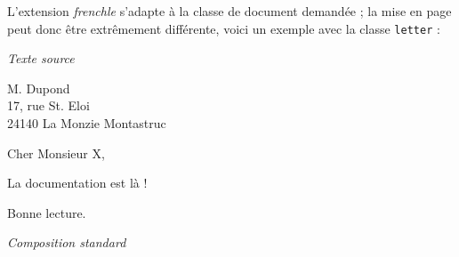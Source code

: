 \documentclass[a4paper,12pt,openright]{article}
\begin{document}
L’extension \textit{frenchle} s’adapte à la classe de document demandée ; la mise
en page peut donc être extrêmement différente, voici un exemple avec la classe
\texttt{letter} :
\begin{center} %
\textit{Texte source}\\[1ex]
\begin{boxedverbatim}
\address{B. \textsc{Gaulle}\\ Mon adresse}
\begin{letter}
       {M. Dupond\\
       17, rue St. \’Eloi\\
       24140 La Monzie Montastruc}

  \opening{Cher Monsieur X,}

  La documentation est là !

  \closing{Bonne lecture.}
\end{letter}
\end{boxedverbatim}

\noindent
\parbox[t]{66mm}{
\begin{center} \nofrenchtypography \nofrenchlayout \english
\textit{Composition standard}
\end{center}
}
\end{center}
\end{document}
